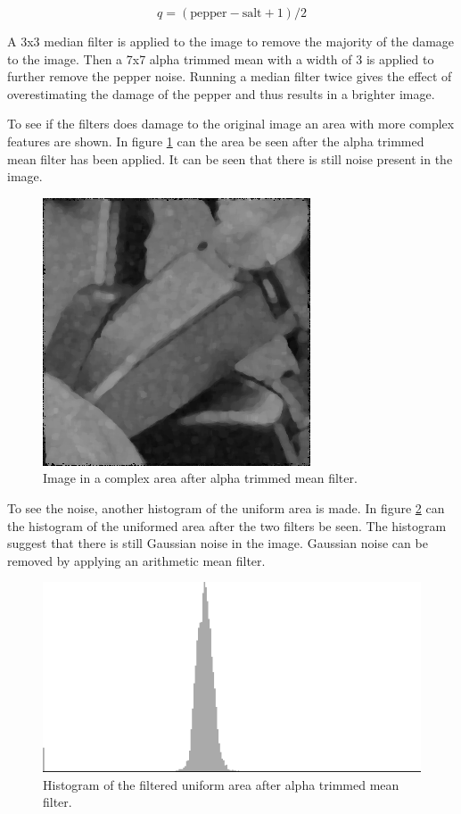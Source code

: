 \begin{equation}
 q = (\text{pepper}-\text{salt}+1)/2 \label{eq:quantile}
\end{equation}

A 3x3 median filter is applied to the image to remove the majority of the damage to the image.
Then a 7x7 alpha trimmed mean with a width of 3 is applied to further remove the pepper noise.
Running a median filter twice gives the effect of overestimating the damage of the pepper and thus results in a brighter image.

To see if the filters does damage to the original image an area with more complex features are shown.
In figure \ref{fig:complex1_after_alpha} can the area be seen after the alpha trimmed mean filter has been applied.
It can be seen that there is still noise present in the image.

\begin{figure}[H]
\centering
\includegraphics[width = \cutOutWidth]{graphics/complex1_step2}
\caption{Image in a complex area after alpha trimmed mean filter.}
\label{fig:complex1_after_alpha}
\end{figure}

To see the noise, another histogram of the uniform area is made.
In figure \ref{fig:hist_img1_after_alpha} can the histogram of the uniformed area after the two filters be seen.
The histogram suggest that there is still Gaussian noise in the image.
Gaussian noise can be removed by applying an arithmetic mean filter.

\begin{figure}[H]
\centering
\includegraphics[width = \histogramWidth]{graphics/hist1_uniform2.png}
\caption{Histogram of the filtered uniform area after alpha trimmed mean filter.}
\label{fig:hist_img1_after_alpha}
\end{figure}

